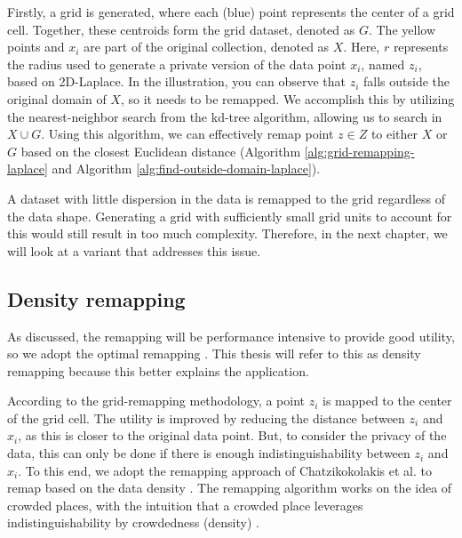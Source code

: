 Firstly, a grid is generated, where each (blue) point represents the center of a grid cell.
Together, these centroids form the grid dataset, denoted as $G$.
The yellow points and $x_i$ are part of the original collection, denoted as $X$.
Here, $r$ represents the radius used to generate a private version of the data point $x_i$, named $z_i$, based on 2D-Laplace.
In the illustration, you can observe that $z_i$ falls outside the original domain of $X$, so it needs to be remapped.
We accomplish this by utilizing the nearest-neighbor search from the kd-tree algorithm, allowing us to search in $X \cup G$.
Using this algorithm, we can effectively remap point $z \in Z$ to either $X$ or $G$ based on the closest Euclidean distance (Algorithm \ref{alg:grid-remapping-laplace} and Algorithm \ref{alg:find-outside-domain-laplace}).

A dataset with little dispersion in the data is remapped to the grid regardless of the data shape. 
Generating a grid with sufficiently small grid units to account for this would still result in too much complexity. 
Therefore, in the next chapter, we will look at a variant that addresses this issue.



\newpage
\subsection{Density remapping} \label{theory:optimal-remapping}
As discussed, the remapping will be performance intensive to provide good utility, so we adopt the optimal remapping \citep{chatzikokolakis_efficient_2017}.
This thesis will refer to this as density remapping because this better explains the application.

According to the grid-remapping methodology, a point $z_i$ is mapped to the center of the grid cell.
The utility is improved by reducing the distance between $z_i$ and $x_i$, as this is closer to the original data point.
But, to consider the privacy of the data, this can only be done if there is enough indistinguishability between $z_i$ and $x_i$.
To this end, we adopt the remapping approach of Chatzikokolakis et al. to remap based on the data density \citep{chatzikokolakis_efficient_2017}.
The remapping algorithm works on the idea of crowded places, with the intuition that a crowded place leverages indistinguishability by crowdedness (density) \citep{chatzikokolakis_efficient_2017}.  \newline

